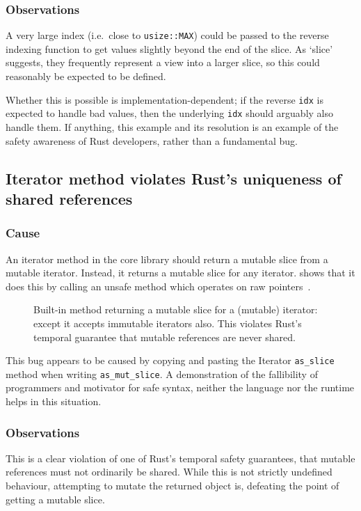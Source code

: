 \documentclass[dissertation.tex]{subfiles}
\begin{document}
\subsubsection{Observations}
A very large index (i.e.\ close to \texttt{usize::MAX}) could be passed
to the reverse indexing function to get values slightly beyond the end
of the slice.
As `slice' suggests, they frequently represent a view into a larger
slice, so this could reasonably be expected to be defined.

Whether this is possible is implementation-dependent; if the
reverse \texttt{idx} is expected to handle bad values, then the
underlying \texttt{idx} should arguably also handle them.
If anything, this example  and its resolution is an example of the
safety awareness of Rust developers, rather than a fundamental bug.


\subsection{Iterator method violates Rust's uniqueness of shared references}
\label{sec:eval-bug-vec-mut}

\subsubsection{Cause}
An iterator method in the core library should return a mutable slice
from a mutable iterator.
Instead, it returns a mutable slice for any iterator.
 shows that it does this by calling an unsafe
method which operates on raw pointers~\cite{rust-issue-vec-mut}.

\begin{figure}[ht]
    
    \caption{
        Built-in method returning a mutable slice for a (mutable)
        iterator: except it accepts immutable iterators also.
        This violates Rust's temporal guarantee that mutable references
        are never shared.
    }
    \label{lst:bug-mutslice}
\end{figure}

This bug appears to be caused by copying and pasting the Iterator
\texttt{as\_slice} method when writing \texttt{as\_mut\_slice}.
A demonstration of the fallibility of programmers and motivator for safe
syntax, neither the language nor the runtime helps in this situation.

\subsubsection{Observations}
This is a clear violation of one of Rust's temporal safety guarantees,
that mutable references must not ordinarily be shared.
While this is not strictly undefined behaviour, attempting to mutate the
returned object is, defeating the point of getting a mutable slice.
\end{document}
